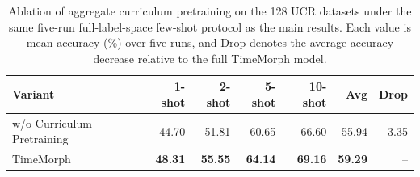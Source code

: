 \begin{table}[t]
\centering
\caption{Ablation of aggregate curriculum pretraining on the 128 UCR datasets under the same five-run full-label-space few-shot protocol as the main results. Each value is mean accuracy (\%) over five runs, and Drop denotes the average accuracy decrease relative to the full TimeMorph model.}
\label{tab:ablation-pretrain}
\begin{tabular}{lrrrrrr}
\toprule
Variant & 1-shot & 2-shot & 5-shot & 10-shot & Avg & Drop \\
\midrule
w/o Curriculum Pretraining & 44.70 & 51.81 & 60.65 & 66.60 & 55.94 & 3.35 \\
TimeMorph & \textbf{48.31} & \textbf{55.55} & \textbf{64.14} & \textbf{69.16} & \textbf{59.29} & -- \\
\bottomrule
\end{tabular}
\end{table}
